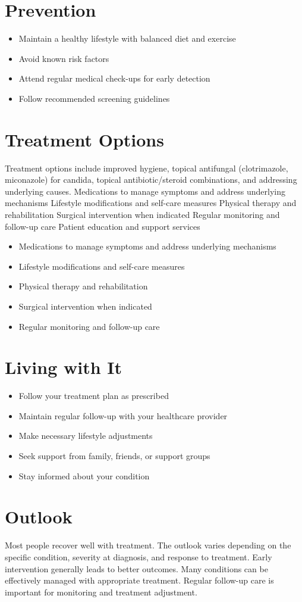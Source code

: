 \section{Prevention}
\begin{itemize}[noitemsep]
  \item Maintain a healthy lifestyle with balanced diet and exercise
  \item Avoid known risk factors
  \item Attend regular medical check-ups for early detection
  \item Follow recommended screening guidelines
\end{itemize}
\section{Treatment Options}
Treatment options include improved hygiene, topical antifungal (clotrimazole, miconazole) for candida, topical antibiotic/steroid combinations, and addressing underlying causes. Medications to manage symptoms and address underlying mechanisms Lifestyle modifications and self-care measures Physical therapy and rehabilitation Surgical intervention when indicated Regular monitoring and follow-up care Patient education and support services

\begin{itemize}[noitemsep]
  \item Medications to manage symptoms and address underlying mechanisms
  \item Lifestyle modifications and self-care measures
  \item Physical therapy and rehabilitation
  \item Surgical intervention when indicated
  \item Regular monitoring and follow-up care
\end{itemize}
\section{Living with It}
\begin{itemize}[noitemsep]
  \item Follow your treatment plan as prescribed
  \item Maintain regular follow-up with your healthcare provider
  \item Make necessary lifestyle adjustments
  \item Seek support from family, friends, or support groups
  \item Stay informed about your condition
\end{itemize}
\section{Outlook}
Most people recover well with treatment. The outlook varies depending on the specific condition, severity at diagnosis, and response to treatment. Early intervention generally leads to better outcomes. Many conditions can be effectively managed with appropriate treatment. Regular follow-up care is important for monitoring and treatment adjustment.
